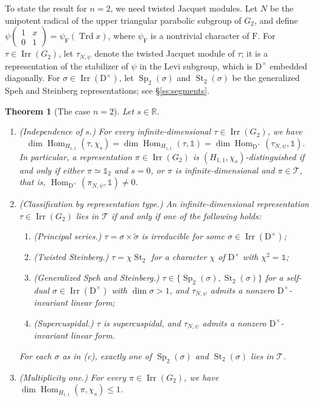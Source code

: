 \documentclass[11pt]{amsart}
\numberwithin{equation}{section}
\theoremstyle{plain}
\newtheorem{mainthm}{Theorem}
\theoremstyle{definition}
\theoremstyle{remark}
\newcommand{\R}{\mathbb{R}}
\newcommand{\one}{\mathds{1}}
\newcommand{\T}{\mathcal{T}}
\DeclareMathOperator{\Hom}{Hom}
\DeclareMathOperator{\Irr}{Irr}
\DeclareMathOperator{\Trd}{Trd}
\DeclareMathOperator{\St}{St}
\DeclareMathOperator{\Sp}{Sp}
\begin{document}
To state the result for $n=2$, we need twisted Jacquet modules. Let $N$ be the unipotent radical of the upper triangular parabolic subgroup of $G_2$, and define $\psi(\begin{smallmatrix}1&x\\0&1\end{smallmatrix})=\psi_{\mathrm{F}}(\Trd x)$, where $\psi_{\mathrm{F}}$ is a nontrivial character of $\mathrm{F}$. For $\tau\in\Irr(G_2)$, let $\tau_{N,\psi}$ denote the twisted Jacquet module of $\tau$; it is a representation of the stabilizer of $\psi$ in the Levi subgroup, which is $\mathrm{D}^\times$ embedded diagonally. For $\sigma\in\Irr(\mathrm{D}^\times)$, let $\Sp_2(\sigma)$ and $\St_2(\sigma)$ be the generalized Speh and Steinberg representations; see \S\ref{ss:segments}.

\begin{mainthm}[The case $n=2$]\label{thm:B}
	Let $s\in\R$.
	\begin{enumerate}[label=\textup{(\roman*)}]
		\item \textup{(Independence of $s$.)} For every infinite-dimensional $\tau\in\Irr(G_2)$, we have
		$$
		\dim\Hom_{H_{1,1}}(\tau,\chi_s)=\dim\Hom_{H_{1,1}}(\tau,\one)=\dim\Hom_{\mathrm{D}^\times}(\tau_{N,\psi},\one).$$
		In particular, a representation $\pi\in\Irr(G_2)$ is $(H_{1,1},\chi_s)$-distinguished if and only if either $\pi\simeq\one_2$ and $s=0$, or $\pi$ is infinite-dimensional and $\pi\in\T$, that is, $\Hom_{\mathrm{D}^\times}(\pi_{N,\psi},\one)\ne0$.
		
		\item \textup{(Classification by representation type.)} An infinite-dimensional representation $\tau\in\Irr(G_2)$ lies in $\T$ if and only if one of the following holds:
		\begin{enumerate}[label=\textup{(\alph*)}]
			\item \textup{(Principal series.)} $\tau=\sigma\times\widetilde\sigma$ is irreducible for some $\sigma\in\Irr(\mathrm{D}^\times)$;
			\item \textup{(Twisted Steinberg.)} $\tau=\chi\St_2$ for a character $\chi$ of $\mathrm{D}^\times$ with $\chi^2=\one$;
			\item \textup{(Generalized Speh and Steinberg.)} $\tau\in\{\Sp_2(\sigma),\St_2(\sigma)\}$ for a self-dual $\sigma\in\Irr(\mathrm{D}^\times)$ with $\dim\sigma>1$, and $\tau_{N,\psi}$ admits a nonzero $\mathrm{D}^\times$-invariant linear form;
			\item \textup{(Supercuspidal.)} $\tau$ is supercuspidal, and $\tau_{N,\psi}$ admits a nonzero $\mathrm{D}^\times$-invariant linear form.
		\end{enumerate}
		For each $\sigma$ as in \textup{(c)}, exactly one of $\Sp_2(\sigma)$ and $\St_2(\sigma)$ lies in $\T$.
		
		\item \textup{(Multiplicity one.)} For every $\pi\in\Irr(G_2)$, we have $\dim\Hom_{H_{1,1}}(\pi,\chi_s)\le1$.
		\end{enumerate}
\end{mainthm}
\end{document}
